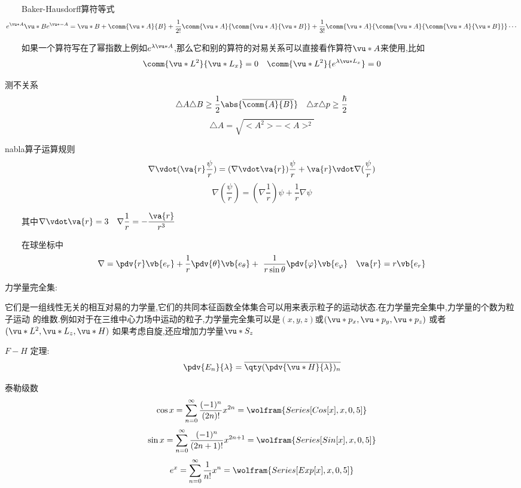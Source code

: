 \begin{formal}
            $\qquad$Baker-Hausdorff算符等式
            $$ 
            e^{\vu*{A}} \vu*{B} e^{\vu*{-A}} = \vu*{B} + \comm{\vu*{A}}{B} + \frac{1}{2!} \comm{\vu*{A}}{\comm{\vu*{A}}{\vu*{B}}} + 
            \frac{1}{3!} \comm{\vu*{A}}{\comm{\vu*{A}}{\comm{\vu*{A}}{\vu*{B}}}} \cdots 
            $$


            $\qquad$如果一个算符写在了幂指数上例如$e^{\lambda \vu*{A}}$,那么它和别的算符的对易关系可以直接看作算符$\vu*{A}$来使用,比如
            $$ \comm{\vu*{L}^{2}}{\vu*{L}_{x}} = 0 \quad \comm{\vu*{L^{2}}}{e^{\lambda \vu*{L}_{x}}} = 0 $$
        
            
            测不关系
            $$ \triangle{A} \triangle{B} \geq \frac{1}{2} \abs{\overline{\comm{A}{B}}} \quad \triangle{x} \triangle{p} \geq \frac{\hbar}{2}   $$
            $$ \triangle{A} = \sqrt{<A^{2}> - <A>^{2}} $$
            
            nabla算子运算规则
            $$ \nabla \vdot (\va{r} \frac{\psi}{r})  =  (\nabla \vdot \va{r}) \frac{\psi}{r} + \va{r} \vdot \nabla(\frac{\psi}{r}) $$
            $$ \nabla (\frac{\psi}{r}) = (\nabla \frac{1}{r})\psi + \frac{1}{r} \nabla \psi $$
            
            $\qquad$其中$ \nabla \vdot \va{r} = 3 \quad \nabla \dfrac{1}{r} = - \dfrac{\va{r}}{r^{3}} $

            $\qquad$在球坐标中
            $$ \nabla =  \pdv{r} \vb{e_{r}} +  \frac{1}{r} \pdv{\theta} \vb{e_{\theta}} + \ \frac{1}{r \sin{\theta}} \pdv{\varphi} \vb{e_{\varphi}} \quad \va{r} = r \vb{e_{r}}  $$         

            力学量完全集:
            
            \indent 它们是一组线性无关的相互对易的力学量,它们的共同本征函数全体集合可以用来表示粒子的运动状态.在力学量完全集中,力学量的个数为粒子运动
            的维数.例如对于在三维中心力场中运动的粒子,力学量完全集可以是$(x,y,z)$或$(\vu*{p}_{x} , \vu*{p_{y}} , \vu*{p}_{z})$ 或者$ (\vu*{L}^{2} , \vu*{L}_{z} , \vu*{H}) $ 如果考虑自旋,还应增加力学量$\vu*{S_{z}}$

            $ F - H $ 定理:
             $$ \pdv{E_{n}}{\lambda} = \overline{\qty(\pdv{\vu*{H}}{\lambda})_{n}} $$

            泰勒级数
            $$ \cos{x} = \sum_{n=0}^{\infty} \frac{(-1)^{n}}{(2n)!} x^{2n} = \wolfram{Series[Cos[x],{x,0,5}]} $$
            $$ \sin{x} = \sum_{n=0}^{\infty} \frac{(-1)^{n}}{(2n+1)!} x^{2n+1} = \wolfram{Series[Sin[x],{x,0,5}]} $$
            $$ e^{x} = \sum_{n=0}^{\infty} \frac{1}{n!} x^{n} = \wolfram{Series[Exp[x],{x,0,5}]} $$
            
        \end{formal}

